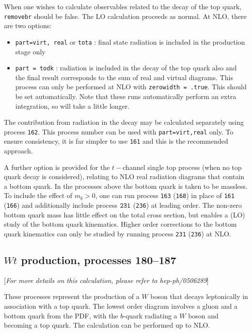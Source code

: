 \documentclass[12pt]{article}
\begin{document}
When one wishes to calculate observables related to the decay of the top
quark, {\tt removebr} should be false.
The LO calculation proceeds as normal. At NLO, there are two options:
\begin{itemize}
\item {\tt part=virt, real} or {\tt tota} : final state radiation is included
in the production stage only
\item {\tt part = todk} : radiation is included in the decay of the top
quark also and the final result corresponds to the sum of real and virtual
diagrams. This process can only be performed at NLO with 
{\tt zerowidth = .true}. This should be set automatically.
Note that these runs automatically perform an extra integration, so
will take a little longer.
\end{itemize}

The contribution from radiation in the decay may be calculated separately using
process {\tt 162}. This process number can be used with {\tt part=virt,real}
only. To ensure consistency, it is far simpler to use {\tt 161}
and this is the recommended approach.

A further option is provided for the $t-$channel single top process (when no
top quark decay is considered), relating to NLO real radiation diagrams that
contain a bottom quark. In the processes above the bottom quark is taken to
be massless. To include the effect of $m_b > 0$, one can run process
{\tt 163} ({\tt 168}) in place of {\tt 161} ({\tt 166}) and additionally include
process $\tt 231$ ({\tt 236}) at leading order.
The non-zero bottom quark mass has little effect on
the total cross section, but enables a (LO) study of the bottom quark kinematics.
Higher order corrections to the bottom quark kinematics can only be studied by running
process {\tt 231} ({\tt 236}) at NLO.

\subsection{$Wt$ production, processes 180--187}
\label{subsec:wt}

\begin{center}
[{\it For more details on this calculation, please refer to hep-ph/0506289}]
\end{center}

These processes represent the production of a $W$ boson that decays leptonically
in association with a top quark. The lowest order diagram involves a gluon and
a bottom quark from the PDF, with the $b$-quark radiating a $W$ boson and
becoming a top quark. The calculation can be performed up to NLO.
\end{document}
